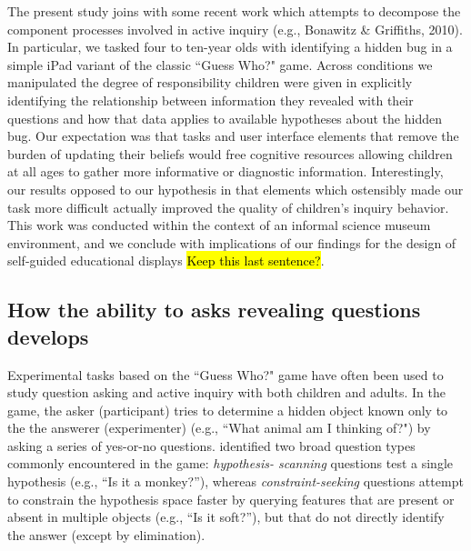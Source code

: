 \documentclass[10pt,letterpaper]{article}
\begin{document}
\nocite{Bonawitz:2010pb}
The present study joins with some recent work which attempts to decompose the 
component processes involved in active inquiry (e.g., Bonawitz \& Griffiths, 2010).  
In particular, we tasked four to ten-year olds with identifying a hidden bug in
a simple iPad variant of the classic ``Guess Who?" game.
Across conditions we manipulated the degree of responsibility children were given in explicitly 
identifying the relationship between information they revealed with their questions and 
how that data applies to available hypotheses about the hidden bug.  Our 
expectation was that tasks and user interface elements that  remove the burden of 
updating their beliefs would free cognitive resources allowing children at all ages to  
gather more informative or diagnostic information. 
Interestingly, our results opposed to our hypothesis in that elements which 
ostensibly made our task more difficult actually improved the quality of children's inquiry 
behavior.  
This work was conducted within the context of an informal science museum
environment, and we conclude with implications of our findings for the design of
self-guided educational displays \hl{Keep this last sentence?}.

\subsection{How the ability to asks revealing questions develops}

Experimental tasks based on the ``Guess Who?" game have often been used to
study question asking and active inquiry with both children and adults.
In the game, the asker (participant) tries to determine a hidden object known
only to the the answerer (experimenter) (e.g., ``What animal am I thinking of?")
by asking a series of yes-or-no questions.
 identified two broad question types commonly encountered in the game: \emph{hypothesis-
scanning} questions test a single hypothesis (e.g., ``Is it a monkey?''), whereas 
\emph{constraint-seeking} questions attempt to constrain the hypothesis space faster by 
querying features that are present or absent in multiple objects (e.g., ``Is it soft?''), 
but that do not directly identify the answer (except by elimination). 
\end{document}

